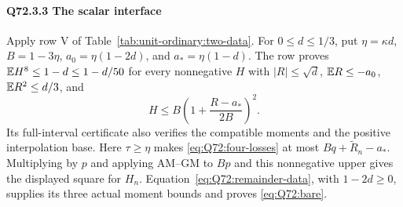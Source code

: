 \paragraph{Q72.3.3 The scalar interface}\label{part:Q72.3.3}
Apply row V of Table~\ref{tab:unit-ordinary:two-data}. For
\(0\le d\le1/3\), put \(\eta=\kappa d\), \(B=1-3\eta\),
\(a_0=\eta(1-2d)\), and \(a_*=\eta(1-d)\).
The row proves \(\mathbb E H^8\le1-d\le1-d/50\) for every nonnegative
\(H\) with \(|R|\le\sqrt d\), \(\mathbb E R\le-a_0\),
\(\mathbb E R^2\le d/3\), and
\begin{equation}\tag{Q72.3.12}\label{eq:Q72:scalar-interface}
 H\le B\left(1+\frac{R-a_*}{2B}\right)^2.
\end{equation}
Its full-interval certificate also verifies the compatible moments
and the positive interpolation base.
Here \(\tau\ge\eta\) makes \eqref{eq:Q72:four-losses} at most
\(Bq+\widetilde R_n-a_*\). Multiplying by \(p\) and applying
AM--GM to \(Bp\) and this nonnegative upper gives the displayed square
for \(H_n\). Equation~\eqref{eq:Q72:remainder-data}, with
\(1-2d\ge0\), supplies its three actual moment bounds and proves
\eqref{eq:Q72:bare}.
